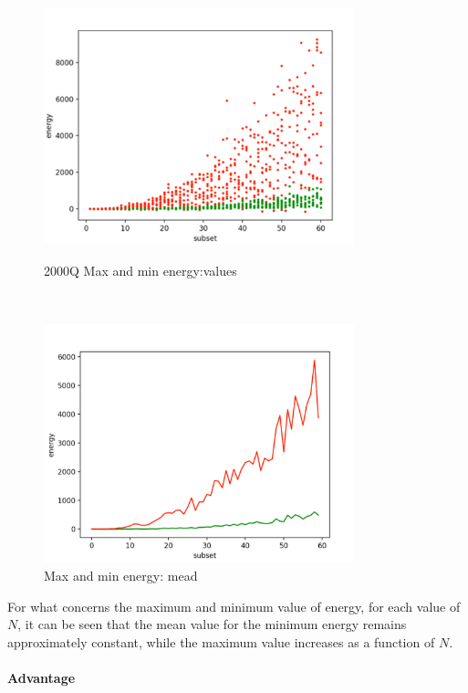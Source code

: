 \documentclass[oneside,a4paper]{article}
\begin{document}
\newpage
\begin{figure}[htp]
\begin{minipage}[b]{7.5cm}
\centering
\includegraphics[width=9cm]{LaTeXTemplate/Images/2000QMaxMinEnValue.png}
\caption{2000Q Max and min energy:values}
\end{minipage}
\ \hspace{2mm} \hspace{2mm} \
\begin{minipage}[b]{9cm}
\centering
\includegraphics[width=9cm]{LaTeXTemplate/Images/2000QMaxMinEnMean.png}
\caption{Max and min energy: mead}
\end{minipage}
\end{figure}
For what concerns the maximum and minimum value of energy, for each value of $N$, it can be seen that the mean value for the minimum energy remains approximately constant, while the maximum value increases as a function of $N$. \\
\\
\textbf{Advantage}
\end{document}
